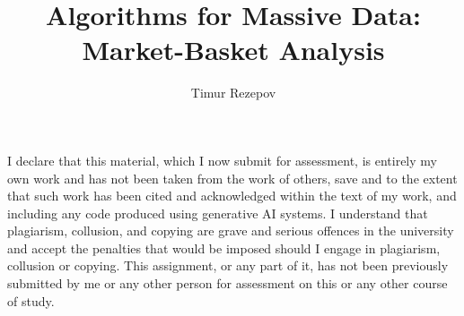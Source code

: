 \documentclass[hidelinks, a4paper,12p, twoside]{report}
\begin{document}
\title{Algorithms for Massive Data: Market-Basket Analysis}
\author{Timur Rezepov}

\beforepreface

%
%
I declare that this material, which I now submit for assessment, is entirely my own work and has not been taken from the work of others, save and to the extent that such work has been cited and acknowledged within the text of my work, and including any code produced using generative AI systems. I understand that plagiarism, collusion, and copying are grave and serious offences in the university and accept the penalties that would be imposed should I engage in plagiarism, collusion or copying. This assignment, or any part of it, has not been previously submitted by me or any other person for assessment on this or any other course of study.

\afterpreface








\end{document}
